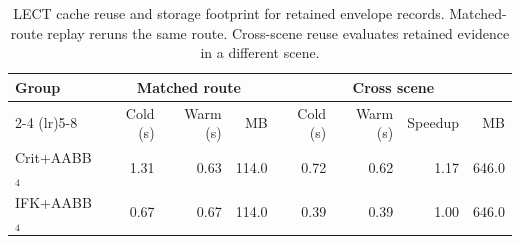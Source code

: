 \begin{table}[t]
\centering
\caption{LECT cache reuse and storage footprint for retained envelope records. Matched-route replay reruns the same route. Cross-scene reuse evaluates retained evidence in a different scene.}
\label{tab:tro_main_lect_cache_footprint}
\footnotesize
\setlength{\tabcolsep}{2.0pt}
\begin{tabular}{@{}lrrrrrrr@{}}
\toprule
Group & \multicolumn{3}{c}{Matched route} & \multicolumn{4}{c}{Cross scene} \\
\cmidrule(lr){2-4} \cmidrule(lr){5-8}
 & Cold (s) & Warm (s) & MB & Cold (s) & Warm (s) & Speedup & MB \\
\midrule
Crit+AABB$_{4}$ & 1.31 & 0.63 & 114.0 & 0.72 & 0.62 & 1.17 & 646.0 \\
IFK+AABB$_{4}$ & 0.67 & 0.67 & 114.0 & 0.39 & 0.39 & 1.00 & 646.0 \\
\bottomrule
\end{tabular}
\end{table}
